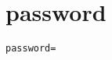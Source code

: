 \section{password}
\label{configuration:Password}
\ClearAPI
\TODO
\begin{lstlisting}[style=Props,caption={Usage example for \textit{password}}]
password=
\end{lstlisting}